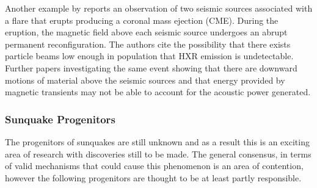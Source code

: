 Another example by \cite{2011ApJ...741L..35Z} reports an observation of two seismic sources associated with a flare that erupts producing a coronal mass ejection (CME). During the eruption, the magnetic field above each seismic source undergoes an abrupt permanent reconfiguration. The authors cite the possibility that there exists particle beams low enough in population that HXR emission is undetectable. Further papers investigating the same event \citep{2013SoPh..284..315Z} showing that there are downward motions of material above the seismic sources and that energy provided by magnetic transients may not be able to account for the acoustic power generated.       

\subsubsection{Sunquake Progenitors}\label{sunprog}


The progenitors of sunquakes are still unknown and as a result this is an exciting area of research with discoveries still to be made. The general consensus, in terms of valid mechanisms that could cause this phenomenon is an area of contention, however the following progenitors are thought to be at least partly responsible. \\

